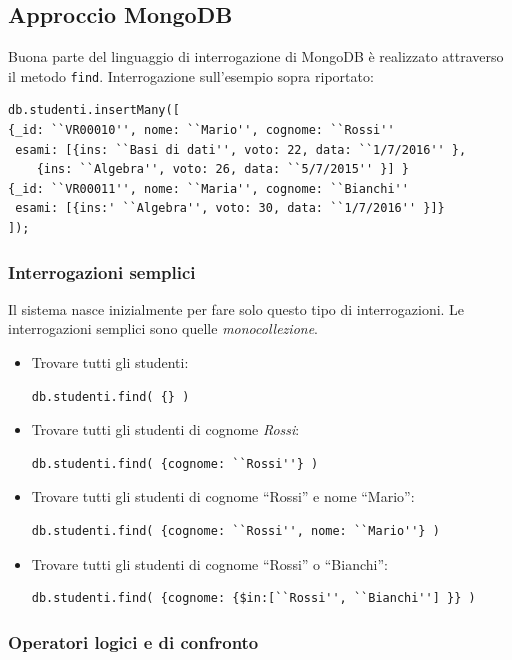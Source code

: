 \documentclass{report}
\begin{document}
\subsection{Approccio MongoDB}

Buona parte del linguaggio di interrogazione di MongoDB \`e realizzato attraverso il metodo \texttt{find}. Interrogazione sull'esempio sopra riportato:

\begin{lstlisting}
db.studenti.insertMany([
{_id: ``VR00010'', nome: ``Mario'', cognome: ``Rossi''
 esami: [{ins: ``Basi di dati'', voto: 22, data: ``1/7/2016'' },
 	{ins: ``Algebra'', voto: 26, data: ``5/7/2015'' }] }
{_id: ``VR00011'', nome: ``Maria'', cognome: ``Bianchi''
 esami: [{ins:' ``Algebra'', voto: 30, data: ``1/7/2016'' }]}
]);
\end{lstlisting}

\subsubsection{Interrogazioni semplici}
Il sistema nasce inizialmente per fare solo questo tipo di interrogazioni. Le interrogazioni semplici sono quelle \emph{monocollezione}.
\begin{itemize}
\item Trovare tutti gli studenti:
\begin{lstlisting}
db.studenti.find( {} )
\end{lstlisting}
\item Trovare tutti gli studenti di cognome \emph{Rossi}:
\begin{lstlisting}
db.studenti.find( {cognome: ``Rossi''} )
\end{lstlisting}
\item Trovare tutti gli studenti di cognome ``Rossi'' e nome ``Mario'':
\begin{lstlisting}
db.studenti.find( {cognome: ``Rossi'', nome: ``Mario''} )
\end{lstlisting}
\item Trovare tutti gli studenti di cognome ``Rossi'' o ``Bianchi'':
\begin{lstlisting}
db.studenti.find( {cognome: {$in:[``Rossi'', ``Bianchi''] }} )
\end{lstlisting}
\end{itemize}

\subsubsection{Operatori logici e di confronto}
\end{document}
